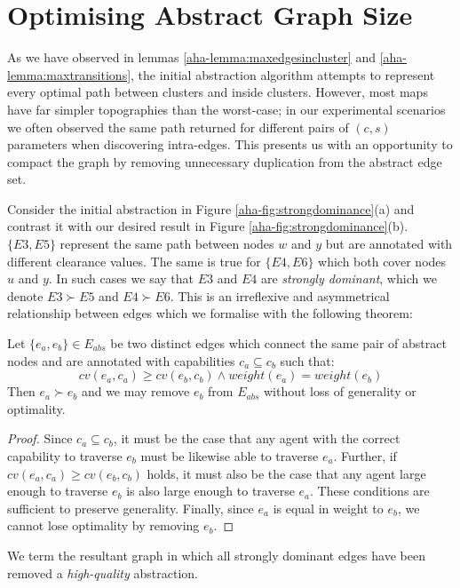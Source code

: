 \section{Optimising Abstract Graph Size}
\par \indent
As we have observed in lemmas \ref{aha-lemma:maxedgesincluster} and \ref{aha-lemma:maxtransitions}, the initial abstraction algorithm attempts to represent every optimal path between clusters and inside clusters.
However, most maps have far simpler topographies than the worst-case; in our  experimental scenarios we often observed the same path returned for different pairs of $(c, s)$ parameters when discovering intra-edges.
This presents us with an opportunity to compact the graph by removing unnecessary duplication from the abstract edge set. 
\par \indent
Consider the initial abstraction in Figure \ref{aha-fig:strongdominance}(a) and contrast it with our desired result in Figure \ref{aha-fig:strongdominance}(b). 
$\lbrace E3, E5 \rbrace$ represent the same path between nodes $w$ and $y$ but are annotated with different clearance values. 
The same is true  for $\lbrace E4, E6 \rbrace$ which both cover nodes $u$ and $y$. 
In such cases we say that $E3$ and $E4$ are \emph{strongly dominant}, which we denote $E3 \succ E5$ and $E4 \succ E6$. 
This is an irreflexive and asymmetrical relationship between edges which we formalise with the following theorem: 
\begin{theorem}
\label{aha-theorem:strongdominance}
Let $\lbrace e_{a}, e_{b} \rbrace \in E_{abs}$ be two distinct edges which connect the same pair of abstract nodes and are annotated with capabilities $c_{a} \subseteq c_{b}$ such that: 
$$ cv(e_{a}, c_{a}) \geq cv(e_{b}, c_{b}) \wedge weight(e_{a}) = weight(e_{b})$$
Then $e_{a} \succ e_{b}$ and we may remove $e_{b}$ from $E_{abs}$ without loss of generality or optimality.
\end{theorem}
\begin{proof}
Since $c_{a} \subseteq c_{b}$, it must be the case that any agent with the correct capability to traverse $e_{b}$ must be likewise able to traverse $e_{a}$.
Further, if $cv(e_{a}, c_{a}) \geq cv(e_{b}, c_{b})$ holds, it must also be the case that any agent large enough to traverse $e_{b}$ is also large enough to traverse $e_{a}$.
These conditions are sufficient to preserve generality.
Finally, since $e_{a}$ is equal in weight to $e_{b}$, we cannot lose optimality by removing $e_{b}$.
\end{proof}
We term the resultant graph in which all strongly dominant edges have been removed a \emph{high-quality} abstraction.  

